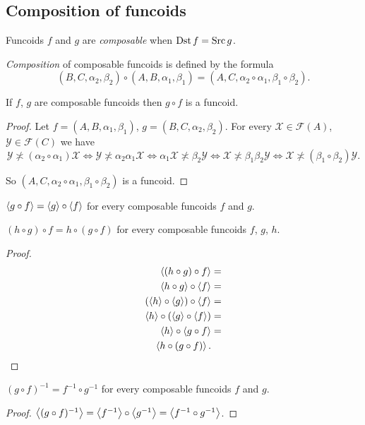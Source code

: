 \subsection{Composition of funcoids}
\begin{defn}
Funcoids $f$
and $g$ are \emph{composable} when $\operatorname{Dst} f=\operatorname{Src} g$.
\end{defn}

\begin{defn}
\emph{Composition}
of composable funcoids is defined by the formula
\[
(B,C,\alpha_{2},\beta_{2})\circ(A,B,\alpha_{1},\beta_{1})=(A,C,\alpha_{2}
\circ\alpha_{1},\beta_{1}\circ\beta_{2}).
\]
\end{defn}
\begin{prop}
If $f$, $g$ are composable funcoids then $g\circ f$ is a funcoid.\end{prop}
\begin{proof}
Let $f=(A,B,\alpha_{1},\beta_{1})$, $g=(B,C,\alpha_{2},\beta_{2})$.
For every $\mathcal{X}\in\mathscr{F}(A)$, $\mathcal{Y}\in\mathscr{F}(C)$
we have
\[
\mathcal{Y}\nasymp(\alpha_{2}\circ\alpha_{1})\mathcal{X}\Leftrightarrow\mathcal{
Y}\nasymp\alpha_{2}\alpha_{1}\mathcal{X}\Leftrightarrow\alpha_{1}\mathcal{X}
\nasymp\beta_{2}\mathcal{Y}\Leftrightarrow\mathcal{X}\nasymp\beta_{1}\beta_{2}
\mathcal{Y}\Leftrightarrow\mathcal{X}\nasymp(\beta_{1}\circ\beta_{2})\mathcal{Y}
.
\]


So $(A,C,\alpha_{2}\circ\alpha_{1},\beta_{1}\circ\beta_{2})$ is a
funcoid.\end{proof}
\begin{obvious}
$\left\langle g\circ f\right\rangle=\left\langle g\right\rangle\circ\left\langle f\right\rangle$ for every composable
funcoids $f$ and $g$.\end{obvious}
\begin{prop}
$(h\circ g)\circ f=h\circ(g\circ f)$ for every composable funcoids
$f$, $g$, $h$.\end{prop}
\begin{proof}
~
\begin{align*}
\left\langle (h\circ g)\circ f\right\rangle & =\\
\left\langle h\circ g\right\rangle\circ\left\langle f\right\rangle & =\\
(\left\langle h\right\rangle\circ\left\langle g\right\rangle)\circ\left\langle f\right\rangle & =\\
\left\langle h\right\rangle\circ(\left\langle g\right\rangle\circ\left\langle f\right\rangle) & =\\
\left\langle h\right\rangle\circ\left\langle g\circ f\right\rangle & =\\
\left\langle h\circ(g\circ f)\right\rangle.
\end{align*}
\end{proof}
\begin{thm}
$(g\circ f)^{-1}=f^{-1}\circ g^{-1}$ for every composable funcoids
$f$ and $g$.\end{thm}
\begin{proof}
$\left\langle (g\circ
f)^{-1}\right\rangle=\left\langle f^{-1}\right\rangle\circ\left\langle g^{-1}\right\rangle=\left\langle f^{-1}\circ g^{-1}\right\rangle$.
\end{proof}


